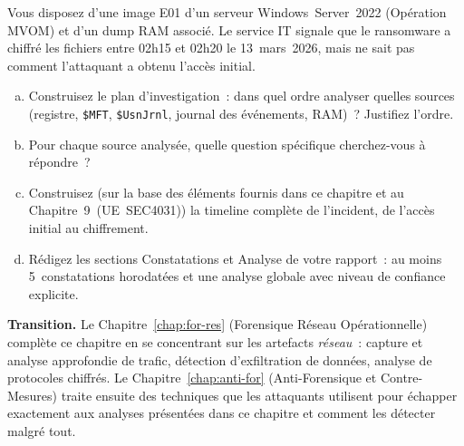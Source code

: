 \begin{boxexo}[title={\ding{45}\quad Exercice~14.3. Timeline complète \niveauexpert}]
Vous disposez d'une image E01 d'un serveur Windows~Server~2022
(Opération MVOM) et d'un dump RAM associé. Le service IT signale
que le ransomware a chiffré les fichiers entre 02h15 et 02h20
le 13~mars~2026, mais ne sait pas comment l'attaquant a obtenu
l'accès initial.

\begin{enumerate}[(a)]
    \item Construisez le plan d'investigation~: dans quel ordre
          analyser quelles sources (registre, \texttt{\$MFT},
          \texttt{\$UsnJrnl}, journal des événements, RAM)~? Justifiez
          l'ordre.
    \item Pour chaque source analysée, quelle question spécifique
          cherchez-vous à répondre~?
    \item Construisez (sur la base des éléments fournis dans ce
          chapitre et au Chapitre~9~(UE~SEC4031)) la timeline complète
          de l'incident, de l'accès initial au chiffrement.
    \item Rédigez les sections Constatations et Analyse de votre
          rapport~: au moins 5~constatations horodatées et une
          analyse globale avec niveau de confiance explicite.
\end{enumerate}
\end{boxexo}

\bigskip

\begin{boxinfo}
\textbf{Transition.} Le Chapitre~\ref{chap:for-res} (Forensique Réseau
Opérationnelle) complète ce chapitre en se concentrant sur les artefacts
\emph{réseau}~: capture et analyse approfondie de trafic, détection
d'exfiltration de données, analyse de protocoles chiffrés. Le
Chapitre~\ref{chap:anti-for} (Anti-Forensique et Contre-Mesures)
traite ensuite des techniques que les attaquants utilisent pour
échapper exactement aux analyses présentées dans ce chapitre et
comment les détecter malgré tout.
\end{boxinfo}
